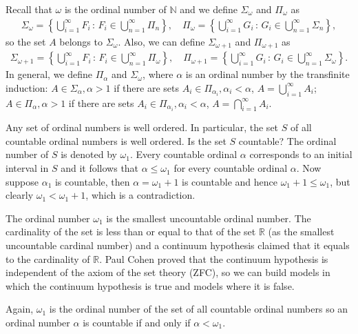 \documentclass[11pt]{book}
\theoremstyle{definition}
\numberwithin{equation}{chapter}
\begin{document}
Recall that $\omega$ is the ordinal number of $\mathbb{N}$ and we define $\Sigma_{\omega}$ and $\Pi_{\omega}$ as
\begin{align*}
    \Sigma_{\omega} = \left\{\bigcup^\infty_{i=1} F_i \,:\, F_i \in \bigcup^\infty_{n=1} \Pi_n\right\}, \quad \Pi_{\omega} = \left\{\bigcup^\infty_{i=1} G_i \,:\, G_i \in \bigcup^\infty_{n=1} \Sigma_n\right\},
\end{align*}
so the set $A$ belongs to $\Sigma_{\omega}$. Also, we can define $\Sigma_{\omega + 1}$ and $\Pi_{\omega + 1}$ as
\begin{align*}
    \Sigma_{\omega+1} = \left\{\bigcup^\infty_{i=1} F_i \,:\, F_i \in \bigcup^\infty_{n=1} \Pi_{\omega}\right\},\quad \Pi_{\omega+1} = \left\{\bigcup^\infty_{i=1} G_i \,:\, G_i \in \bigcup^\infty_{n=1} \Sigma_{\omega}\right\}.
\end{align*}
In general, we define $\Pi_{\alpha}$ and $\Sigma_{\omega}$, where $\alpha$ is an ordinal number by the transfinite induction: $A \in \Sigma_{\alpha}, \alpha > 1$ if there are sets $A_i \in \Pi_{\alpha_i}, \alpha_i < \alpha$, $A = \bigcup^\infty_{i=1} A_i$; $A \in \Pi_{\alpha}, \alpha > 1$ if there are sets $A_i \in \Pi_{\alpha_i}, \alpha_i < \alpha$, $A = \bigcap^\infty_{i=1} A_i$.

Any set of ordinal numbers is well ordered. In particular, the set $S$ of all countable ordinal numbers is well ordered. Is the set $S$ countable? The ordinal number of $S$ is denoted by $\omega_1$. Every countable ordinal $\alpha$ corresponds to an initial interval in $S$ and it follows that $\alpha \leq \omega_1$ for every countable ordinal $\alpha$. Now suppose $\alpha_1$ is countable, then $\alpha = \omega_1 + 1$ is countable and hence $\omega_1 + 1 \leq \omega_1$, but clearly $\omega_1 < \omega_1 + 1$, which is a contradiction. 

The ordinal number $\omega_1$ is the smallest uncountable ordinal number. The cardinality of the set is less than or equal to that of the set $\mathbb{R}$ (as the smallest uncountable cardinal number) and a continuum hypothesis claimed that it equals to the cardinality of $\mathbb{R}$. Paul Cohen proved that the continuum hypothesis is independent of the axiom of the set theory (ZFC), so we can build models in which the continuum hypothesis is true and models where it is false.

Again, $\omega_1$ is the ordinal number of the set of all countable ordinal numbers so an ordinal number $\alpha$ is countable if and only if $\alpha < \omega_1$. 
\end{document}
